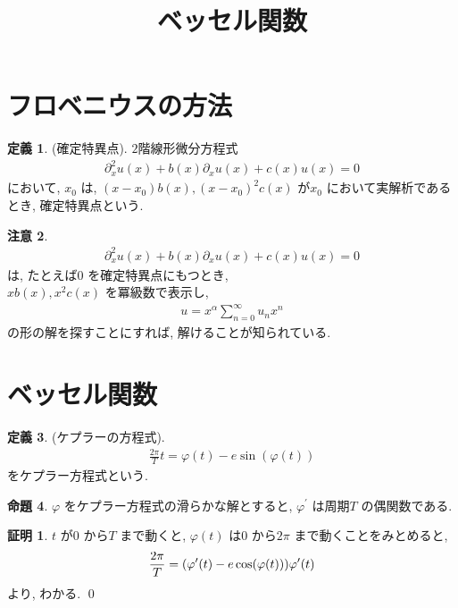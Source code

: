 \documentclass[10pt, fleqn, label-section=none]{bxjsarticle}
\title{ベッセル関数}
\date{}
\author{}
\theoremstyle{definition}
\newtheorem{dfn}{定義}[section]
\newtheorem{prop}[dfn]{命題}
\newtheorem*{pf*}{証明}
\newtheorem{remark}[dfn]{注意}
\newcommand{\paren}[1]{\mleft( #1\mright )}
\renewcommand{\;}{\, ; \,}
\begin{document}
\maketitle

\section{フロベニウスの方法}

\begin{dfn}(確定特異点). $2$階線形微分方程式
\begin{align*} \partial_x ^2 u(x) + b(x) \partial_x u(x) + c(x)u(x) = 0 \end{align*}
において, $x_0$ は, $(x-x_0)b(x), (x - x_0)^2 c(x)$ が$x_0$ において実解析であるとき, 確定特異点という. 
\end{dfn}

\begin{remark}
\begin{align*} \partial_x ^2 u(x) + b(x) \partial_x u(x) + c(x)u(x) = 0 \end{align*}
は, たとえば$0$ を確定特異点にもつとき, \\
$xb(x), x^2c(x)$ を冪級数で表示し, 
\begin{align*} u = x^\alpha \sum_{n =0} ^\infty u_n x^n \end{align*}
の形の解を探すことにすれば, 解けることが知られている. 
\end{remark}



\section{ベッセル関数}

\begin{dfn}(ケプラーの方程式). 
\begin{align*} \frac{2 \pi}{ T} t = \varphi(t) - e \sin (\varphi (t))  \end{align*}
をケプラー方程式という. 
\end{dfn}

\begin{prop}$\varphi$ をケプラー方程式の滑らかな解とすると, $\varphi ^\prime $ は周期$T$ の偶関数である. 
\end{prop}
\begin{pf*}$t$ が$0$ から$T$ まで動くと, $\varphi(t)$ は$0$ から$2 \pi$ まで動くことをみとめると, 
\begin{align*} \frac{2\pi}{T} = \paren{ \varphi^\prime (t) - e \cos (\varphi(t) ) } \varphi^\prime(t)  \end{align*}
より, わかる. 
\qed
\end{pf*}
\end{document}
